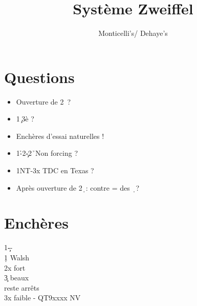 \documentclass[a4paper]{article}
\title{Système Zweiffel}
\author{Monticelli's/ Dehaye's}
\begin{document}
\maketitle
\tableofcontents

\section{Questions}

\begin{itemize}
\item Ouverture de 2\s\ ?

\end{itemize}

\begin{itemize}
\item 1\c\ 3è ?

\end{itemize}

\begin{itemize}
\item Enchères d'essai naturelles !

\end{itemize}

\begin{itemize}
\item 1\h -2\c -2\h\ Non forcing ?

\end{itemize}

\begin{itemize}
\item 1NT-3x TDC en Texas ?

\end{itemize}

\begin{itemize}
\item Après ouverture de 2\d\ : contre = des \d\ ?

\end{itemize}

\section{Enchères}

\begin{bidtable}
1\c--\+\\
1\d \> Walsh\\
2x \> fort\+\\
3\c \> beaux \c \\
reste \> arrêts\-\\
3x \> faible - QT9xxxx NV\-
\end{bidtable}
\end{document}
